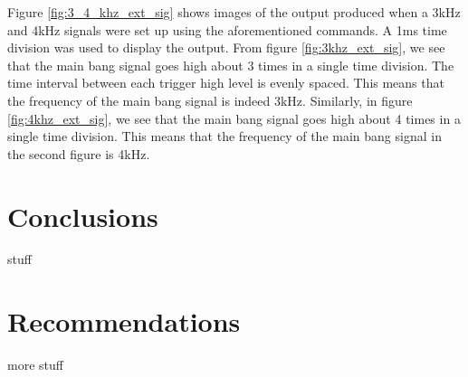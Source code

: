 \documentclass[12pt, a4paper]{article}
\begin{document}
Figure \ref{fig:3_4_khz_ext_sig} shows images of the output produced when a 3kHz and 4kHz signals were set up using the aforementioned commands. A 1ms time division was used to display the output. From figure \ref{fig:3khz_ext_sig}, we see that the main bang signal goes high about 3 times in a single time division. The time interval between each trigger high level is evenly spaced. This means that the frequency of the main bang signal is indeed 3kHz. Similarly, in figure \ref{fig:4khz_ext_sig}, we see that the main bang signal goes high about 4 times in a single time division. This means that the frequency of the main bang signal in the second figure is 4kHz.

\section{Conclusions}


stuff

\section{Recommendations}


more stuff
\end{document}

